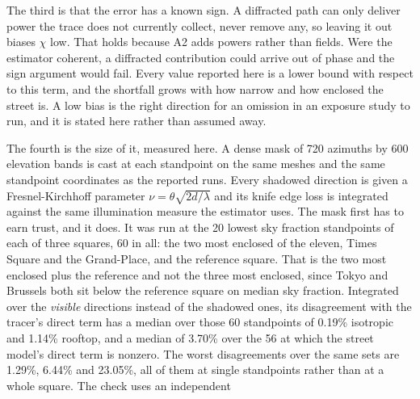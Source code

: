 The third is that the error has a known sign. A diffracted path can only deliver
power the trace does not currently collect, never remove any, so leaving it out
biases $\chi$ low. That holds because A2 adds powers rather than fields. Were the
estimator coherent, a diffracted contribution could arrive out of phase and the
sign argument would fail. Every value reported here is a lower bound with respect
to this term, and the shortfall grows with how narrow and how enclosed the street
is. A low bias is the right direction for an omission in an exposure study to
run, and it is stated here rather than assumed away.

The fourth is the size of it, measured here. A dense mask of 720 azimuths by 600
elevation bands is cast at each standpoint on the same meshes and the same
standpoint coordinates as the reported runs. Every shadowed direction is given a
Fresnel-Kirchhoff parameter $\nu = \theta\sqrt{2d/\lambda}$ and its knife edge
loss \cite{p526} is integrated against the same illumination measure the
estimator uses. The
mask first has to earn trust, and it does. It was run at the 20 lowest sky
fraction standpoints of each of three squares, 60 in all: the two most enclosed
of the eleven, Times Square and the Grand-Place, and the reference square. That
is the two most enclosed plus the reference and not the three most enclosed,
since Tokyo and Brussels both sit below the reference square on median sky
fraction. Integrated over the \emph{visible} directions instead of the shadowed
ones, its disagreement with the tracer's direct term has a median over those 60
standpoints of 0.19\% isotropic and 1.14\% rooftop, and a median of 3.70\% over
the 56 at which the street model's direct term is nonzero. The worst
disagreements over the same sets are 1.29\%, 6.44\% and 23.05\%, all of them at
single standpoints rather than at a whole square. The check uses an independent
